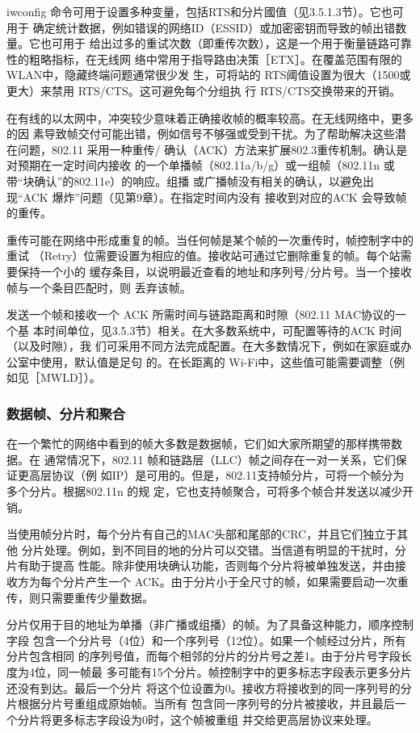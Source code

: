 iwconfig 命令可用于设置多种变量，包括RTS和分片國值（见3.5.1.3节）。它也可用于
确定统计数据，例如错误的网络ID（ESSID）或加密密钥而导致的帧出错数量。它也可用于
给出过多的重试次数（即重传次数），这是一个用于衡量链路可靠性的粗略指标，在无线网
络中常用于指导路由决策［ETX］。在覆盖范围有限的WLAN中，隐藏终端问题通常很少发
生，可将站的 RTS阈值设置为很大（1500或更大）来禁用 RTS/CTS。这可避免每个分组执
行 RTS/CTS交换带来的开销。

在有线的以太网中，冲突较少意味着正确接收帧的概率较高。在无线网络中，更多的因
素导致帧交付可能出错，例如信号不够强或受到干扰。为了帮助解决这些潜在问题，802.11
采用一种重传/ 确认（ACK）方法来扩展802.3重传机制。确认是对预期在一定时间内接收
的一个单播帧（802.11a/b/g）或一组帧（802.11n 或带“块确认”的802.11e）的响应。组播
或广播帧没有相关的确认，以避免出现“ACK 爆炸”问题（见第9章）。在指定时间内没有
接收到对应的ACK 会导致帧的重传。

重传可能在网络中形成重复的帧。当任何帧是某个帧的一次重传时，帧控制字中的重试
（Retry）位需要设置为相应的值。接收站可通过它删除重复的帧。每个站需要保持一个小的
缓存条目，以说明最近查看的地址和序列号/分片号。当一个接收帧与一个条目匹配时，则
丢弃该帧。

发送一个帧和接收一个 ACK 所需时间与链路距离和时隙（802.11 MAC协议的一个基
本时间单位，见3.5.3节）相关。在大多数系统中，可配置等待的ACK 时间（以及时隙），我
们可采用不同方法完成配置。在大多数情况下，例如在家庭或办公室中使用，默认值是足句
的。在长距离的 Wi-Fi中，这些值可能需要调整（例如见［MWLD］）。

\subsubsection{数据帧、分片和聚合}

在一个繁忙的网络中看到的帧大多数是数据帧，它们如大家所期望的那样携带数据。在
通常情况下，802.11 帧和链路层（LLC）帧之间存在一对一关系，它们保证更高层协议（例
如IP）是可用的。但是，802.11支持帧分片，可将一个帧分为多个分片。根据802.11n 的规
定，它也支持帧聚合，可将多个帧合并发送以减少开销。

当使用帧分片时，每个分片有自己的MAC头部和尾部的CRC，并且它们独立于其他
分片处理。例如，到不同目的地的分片可以交错。当信道有明显的干扰时，分片有助于提高
性能。除非使用块确认功能，否则每个分片将被单独发送，并由接收方为每个分片产生一个
ACK。由于分片小于全尺寸的帧，如果需要启动一次重传，则只需要重传少量数据。

分片仅用于目的地址为单播（非广播或组播）的帧。为了具备这种能力，顺序控制字段
包含一个分片号（4位）和一个序列号（12位）。如果一个帧经过分片，所有分片包含相同
的序列号值，而每个相邻的分片的分片号之差1。由于分片号字段长度为4位，同一帧最
多可能有15个分片。帧控制字中的更多标志字段表示更多分片还没有到达。最后一个分片
将这个位设置为0。接收方将接收到的同一序列号的分片根据分片号重组成原始帧。当所有
包含同一序列号的分片被接收，并且最后一个分片将更多标志字段设为0时，这个帧被重组
并交给更高层协议来处理。


